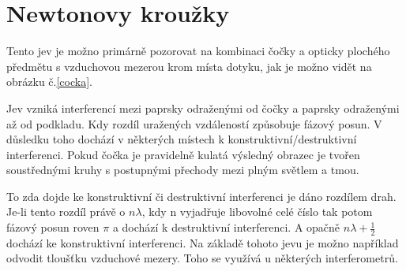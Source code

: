 \documentclass[a4paper, 12pt]{article}
\begin{document}
\section{Newtonovy kroužky}
 Tento jev je možno primárně pozorovat na kombinaci čočky a opticky plochého předmětu s vzduchovou mezerou krom místa dotyku, jak je možno vidět na obrázku č.\ref{cocka}.

Jev vzniká  interferencí mezi paprsky odraženými od čočky a paprsky odraženými až od podkladu. Kdy rozdíl uražených vzdáleností způsobuje fázový posun. V důsledku toho dochází v některých místech k konstruktivní/destruktivní interferenci. Pokud čočka je pravidelně kulatá výsledný obrazec je tvořen soustřednými kruhy s postupnými přechody mezi plným světlem a tmou.

To zda dojde ke konstruktivní či destruktivní interferenci je dáno rozdílem drah. Je-li tento rozdíl právě o $n\lambda$, kdy n vyjadřuje libovolné celé číslo tak potom fázový posun roven $\pi$ a dochází k destruktivní interferenci. A opačně $n\lambda + \frac{1}{2}$ dochází ke konstruktivní interferenci. Na základě tohoto jevu je možno například odvodit tloušťku vzduchové mezery. Toho se využívá u některých interferometrů.
\\
\end{document}
